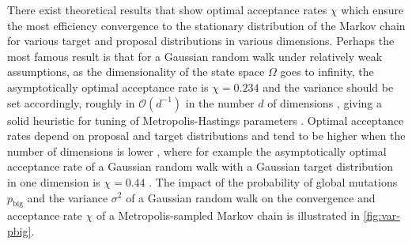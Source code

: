 \documentclass[oneside, a4paper]{article}
\newcommand\br[1]{\left(#1\right)}
\begin{document}
There exist theoretical results that show optimal acceptance rates $\chi$ which ensure the most efficiency convergence to the stationary distribution of the Markov chain for various target and proposal distributions in various dimensions. Perhaps the most famous result is that for a Gaussian random walk under relatively weak assumptions, as the dimensionality of the state space $\Omega$ goes to infinity, the asymptotically optimal acceptance rate is $\chi=0.234$ and the variance should be set accordingly, roughly in $\mathcal{O}\br{d^{-1}}$ in the number $d$ of dimensions \autocite{transience}, giving a solid heuristic for tuning of Metropolis-Hastings parameters \autocite{optimal-mcmc-scaling}. Optimal acceptance rates depend on proposal and target distributions and tend to be higher when the number of dimensions is lower \autocite{optimal-low-dim-lower}, where for example the asymptotically optimal acceptance rate of a Gaussian random walk with a Gaussian target distribution in one dimension is $\chi=0.44$ \autocite{optimal-1d-044}. The impact of the probability of global mutations $p_\text{big}$ and the variance $\sigma^2$ of a Gaussian random walk on the convergence and acceptance rate $\chi$ of a Metropolis-sampled Markov chain is illustrated in \autoref{fig:var-pbig}.\\
\end{document}
